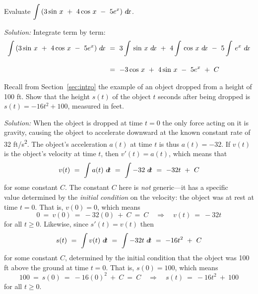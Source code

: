 \newpage
\begin{exmp}\label{antideriv7}
\noindent Evaluate $\displaystyle\int\,(3\sin\,x ~+~ 4\cos\,x ~-~ 5e^x)~d\!x$.\vspace{1mm}
\par\noindent\emph{Solution:} Integrate term by term:
\begin{align*}
\int\,(3\sin\,x ~+~ 4\cos\,x ~-~ 5e^x)~d\!x ~&=~
3\int\,\sin\,x~d\!x ~+~ 4\int\,\cos\,x~d\!x ~-~ 5\int\,e^x~d\!x\\[10pt]
&=~ -3\cos\,x ~+~ 4\sin\,x ~-~ 5e^x ~+~ C
\end{align*}
\end{exmp}
\begin{exmp}\label{exmp:gravity}
\noindent Recall from Section~\ref{sec:intro} the example of an object dropped from a height
of 100 ft. Show that the height $s(t)$ of the object $t$ seconds after being
dropped is $s(t) = -16t^2 + 100$, measured in feet.\vspace{1mm}
\par\noindent\emph{Solution:} When the object is dropped at time $t=0$ the only
force acting on it is gravity, causing the object to accelerate downward at the
known constant rate of 32 ft/s\textsuperscript{2}. The object's acceleration
$a(t)$ at time $t$ is thus $a(t) = -32$. If $v(t)$ is the object's velocity at
time $t$, then $v'(t) = a(t)$, which means that
\[
v(t) ~=~ \int a(t)~d\!t ~=~ \int -32~d\!t ~=~ -32t ~+~ C
\]
for some constant $C$. The constant $C$ here is \emph{not} generic---it has a
specific\\value determined by the \emph{initial condition} on the velocity: the
object was at rest at time $t=0$. That is, $v(0) = 0$, which means
\[
0 ~=~ v(0) ~=~ -32(0) ~+~ C ~=~ C \quad\Rightarrow\quad v(t) ~=~ -32t
\]
for all $t \ge 0$. Likewise, since $s'(t) = v(t)$ then
\[
s(t) ~=~ \int v(t)~d\!t ~=~ \int -32t~d\!t ~=~ -16t^2 ~+~ C
\]
for some constant $C$, determined by the initial condition that the object was 
100 ft above the ground at time $t=0$. That is, $s(0) = 100$, which means
\[
100 ~=~ s(0) ~=~ -16(0)^2 ~+~ C ~=~ C \quad\Rightarrow\quad s(t) ~=~ -16t^2 ~+~ 100
\]
for all $t \ge 0$.\quad\checkmark
\end{exmp}\vspace{-2mm}
\divider
\vspace{2mm}

